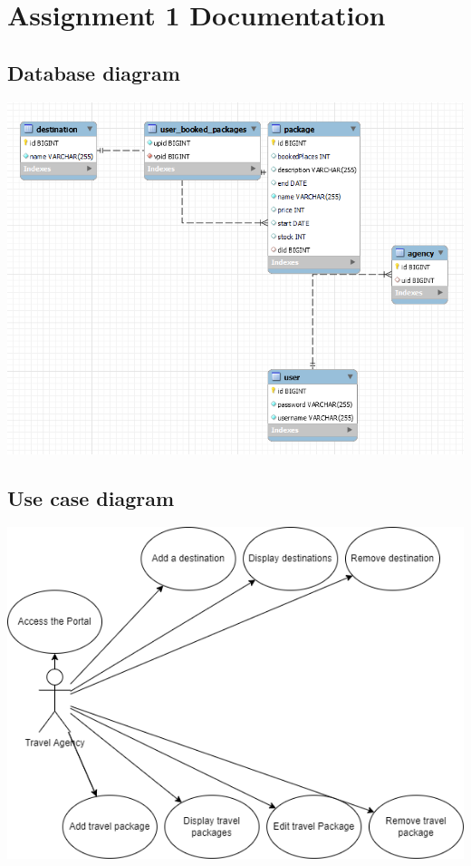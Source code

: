 \documentclass[a4paper,12pt]{report}
\begin{document}
	\part*{Assignment 1 Documentation}
	\chapter*{Database diagram}
		\includegraphics[width=\textwidth]{A1_DB_schema.png}
	\chapter*{Use case diagram}
		\includegraphics[width=\textwidth]{A1_usecase_diagram.png}
\end{document}
